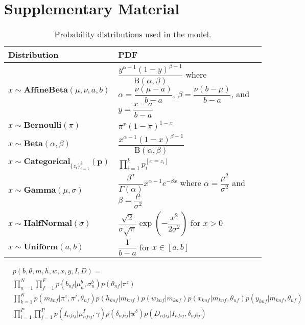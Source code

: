 \section{Supplementary Material}



\begin{table}
\caption{\label{tab:example}Probability distributions used in the model.}
\begin{tabular}{l l}
\toprule
Distribution & PDF \\
\midrule
$x \sim \textbf{AffineBeta}(\mu, \nu, a, b)$ &
    $\dfrac{y^{\alpha-1}(1-y)^{\beta-1}}{\text{B}(\alpha, \beta)}$
    where $\alpha=\dfrac{\nu (\mu-a)}{b-a}$, $\beta=\dfrac{\nu (b-\mu)}{b-a}$, and $y = \dfrac{x-a}{b-a}$ \\
$x \sim \textbf{Bernoulli}(\pi)$ &
    $\pi^x (1-\pi)^{1-x}$ \\
$x \sim \textbf{Beta}(\alpha, \beta)$ &
    $\dfrac{x^{\alpha-1}(1-x)^{\beta-1}}{\text{B}(\alpha, \beta)}$ \\
$x \sim \textbf{Categorical}_{\{z_i\}^k_{i=1}}(\bm{p})$ &
    $\prod_{i=1}^k p_i^{[x=z_i]}$ \\
$x \sim \textbf{Gamma}(\mu, \sigma)$ &
    $\dfrac{\beta^\alpha}{\Gamma(\alpha)}x^{\alpha-1} e^{-\beta x}$
    where $\alpha = \dfrac{\mu^2}{\sigma^2}$ and $\beta = \dfrac{\mu}{\sigma^2}$ \\
$x \sim \textbf{HalfNormal}(\sigma)$ &
    $\dfrac{\sqrt{2}}{\sigma \sqrt{\pi}} \exp \left( -\dfrac{x^2}{2\sigma^2} \right)$
    for  $x > 0$ \\
$x \sim \textbf{Uniform}(a, b)$ &
    $\dfrac{1}{b-a}$ for $x \in [a, b]$ \\
\bottomrule
\end{tabular}
\end{table}


\begin{equation}
\begin{aligned}
    & p(b, \theta, m, h, w, x, y, I, D) = \\
    & \prod^N_{n=1} \prod^F_{f=1} p(b_{nf} | \mu^b_n, \sigma^b_n) p(\theta_{nf} | \pi^z) \\
    & \prod^K_{k=1} p(m_{knf} | \pi^z, \pi^j, \theta_{nf}) p(h_{knf} | m_{knf})
    p(w_{knf} | m_{knf})
    p(x_{knf} | m_{knf}, \theta_{nf}) p(y_{knf} | m_{knf}, \theta_{nf}) \\
    & \prod^P_{i=1} \prod^P_{j=1} p(I_{nfij} | \mu^I_{nfij}, \gamma)
    p(\delta_{nfij} | \bm{\pi}^\delta)
    p(D_{nfij} | I_{nfij}, \delta_{nfij})
\end{aligned}
\end{equation}